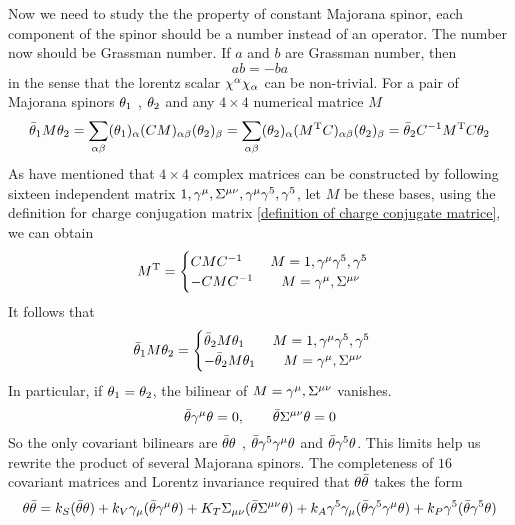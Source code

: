 Now we need to study the the property of constant Majorana spinor, each component of the spinor should be a number instead of an operator. The number now should be Grassman number. If $a$ and $b$ are Grassman number, then
\begin{equation}
   ab = -ba 
\end{equation}
in the sense that the lorentz scalar $\chi^{\alpha}\chi_{\alpha}$ can be non-trivial. For a pair of Majorana spinors $\theta_1$ , $\theta_2$ and any $4\times4$ numerical matrice $M$ 
\begin{equation}
\bar{\theta}_1 M \theta_2 
= \sum_{\alpha\beta} (\theta_{1})_{\alpha} (CM)_{\alpha\beta}(\theta_2)_{\beta}
= \sum_{\alpha\beta} (\theta_2)_{\alpha} (M^{\text{T}}C)_{\alpha\beta}(\theta_2)_{\beta}
= \bar{\theta}_2 C^{-1} M^{\text{T}} C \theta_2
\end{equation}
As have mentioned that $4\times4$ complex matrices can be constructed by following sixteen independent matrix $1,\gamma^{\mu},\Sigma^{\mu\nu},\gamma^{\mu}\gamma^5,\gamma^5$, let $M$ be these bases, using the definition for charge conjugation matrix \eqref{definition of charge conjugate matrice}, we can obtain
\begin{equation}\label{property of charge conjugation matrix C}
  M^{\text{T}} = 
  \begin{cases}
     C M C^{-1}   \qquad  M = 1, \gamma^{\mu}\gamma^5, \gamma^5 \\
     -C M C^{-1}   \qquad M = \gamma^{\mu}, \Sigma^{\mu\nu} 
\end{cases}
\end{equation}
It follows that 
\begin{equation}
\bar{\theta}_1 M \theta_2 =
  \begin{cases}
    \bar{\theta}_2 M \theta_1   \qquad  M = 1, \gamma^{\mu}\gamma^5, \gamma^5 \\
    -\bar{\theta}_2 M \theta_1    \qquad M = \gamma^{\mu}, \Sigma^{\mu\nu}
  \end{cases}
\end{equation}
In particular, if $\theta_1 = \theta_2$,  the bilinear of $M = \gamma^{\mu}, \Sigma^{\mu\nu}$ vanishes.
\begin{equation}\label{the constraint on bilinear of covariant matrices}
 \bar{\theta}\gamma^{\mu}\theta = 0,\qquad \bar{\theta}\Sigma^{\mu\nu}\theta = 0
\end{equation} 
So the only covariant bilinears are $\bar{\theta}\theta$ , $\bar{\theta}\gamma^{5}\gamma^{\mu}\theta$ and $\bar{\theta}\gamma^{5}\theta$. This limits help us rewrite the product of several Majorana spinors. The completeness of $16$ covariant matrices and  Lorentz invariance required that $\theta\bar{\theta}$ takes the form 
\begin{equation}
\theta\bar{\theta}=
k_S(\bar{\theta}\theta)+
k_V\gamma_{\mu}(\bar{\theta}\gamma^{\mu}\theta)+
K_T\Sigma_{\mu\nu}(\bar{\theta}\Sigma^{\mu\nu}\theta)+
k_A\gamma^5\gamma_{\mu}(\bar{\theta}\gamma^5\gamma^{\mu}\theta)+
k_P\gamma^5(\bar{\theta}\gamma^{5}\theta)
\end{equation}

